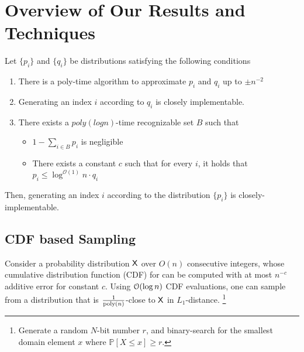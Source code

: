\section{Overview of Our Results and Techniques}%
\label{sec:overview_of_our_results_and_techniques}

\begin{lemma}
\label{lem:rejection_sampling}
Let $\{p_i\}$ and $\{q_i\}$ be distributions satisfying the following conditions
\begin{enumerate}
    \item There is a poly-time algorithm to approximate $p_i$ and $q_i$ up to $\pm n^{-2}$
    \item Generating an index $i$ according to $q_i$ is closely implementable.
    \item There exists a $poly(log n)$-time recognizable set $B$ such that
    \begin{itemize}
        \item $1-\sum\limits_{i\in B} p_i$ is negligible
        \item There exists a constant $c$ such that for every $i$, it holds that $p_i\le \log^{\mathcal{O}(1)} n\cdot q_i$
    \end{itemize}
\end{enumerate}
Then, generating an index $i$ according to the distribution $\{p_i\}$ is closely-implementable.
\end{lemma}

\subsection{CDF based Sampling}%
\label{sec:cdf_based_sampling}
Consider a probability distribution $\mathsf{X}$ over $O(n)$ consecutive integers,
whose cumulative distribution function (CDF) for can be computed with at most $n^{-c}$ additive error for constant $c$.
Using $\Bo(\log n)$ CDF evaluations, one can sample from a distribution that is $\frac{1}{\mathrm{poly}(n)}$-close to $\mathsf{X}$ in $L_1$-distance.
\footnote{Generate a random $N$-bit number $r$, and binary-search for the smallest domain element $x$ where $\mathbb P[X\leq x] \geq r$.}




